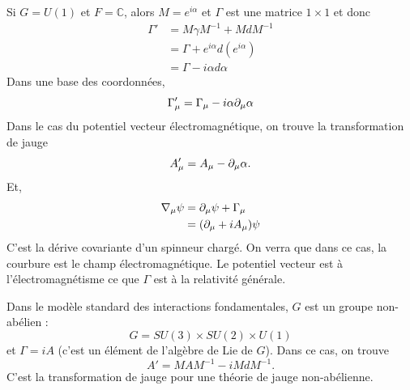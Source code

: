 \documentclass[a4paper,11pt]{report}
\begin{document}
            \begin{exmp}
                Si $G = U(1)$ et $F = \mathbb{C}$, alors $M = e^{i\alpha}$ et $\Gamma$ est une matrice $1\times1$ et donc
                \begin{align}
                    \Gamma' &= M\gamma M^{-1} + MdM^{-1} \\
                    &= \Gamma + e^{i\alpha}d(e^{i\alpha}) \\
                    &= \Gamma-i\alpha d\alpha
                \end{align}
                Dans une base des coordonnées,
                \begin{equation}
                    \Gamma'_\mu = \Gamma_\mu-i\alpha\partial_\mu\alpha
                \end{equation}
                Dans le cas du potentiel vecteur électromagnétique, on trouve la transformation de jauge
                \begin{equation}
                    A'_\mu = A_\mu - \partial_\mu\alpha.
                \end{equation}
                Et, 
                \begin{align}
                    \nabla_\mu\psi &= \partial_\mu\psi + \Gamma_\mu \\
                    &= (\partial_\mu+iA_\mu)\psi
                \end{align}
                C'est la dérive covariante d'un spinneur chargé. On verra que dans ce cas, la courbure est le champ électromagnétique. Le potentiel vecteur est à l'électromagnétisme ce que $\Gamma$ est à la relativité générale.
            \end{exmp}
            
            \begin{exmp}
                Dans le modèle standard des interactions fondamentales, $G$ est un groupe non-abélien :
                \begin{equation}
                    G = SU(3)\times SU(2)\times U(1)
                \end{equation}
                et $\Gamma = iA$ (c'est un élément de l'algèbre de Lie de $G$). Dans ce cas, on trouve
                \begin{equation}
                    A' = MAM^{-1}-iMdM^{-1}.
                \end{equation}
                C'est la transformation de jauge pour une théorie de jauge non-abélienne.
            \end{exmp}
        
\end{document}
